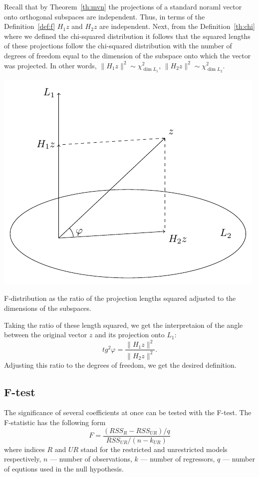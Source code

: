 Recall that by Theorem~\ref{th:mvn} the projections of a standard noraml vector
onto orthogonal subspaces are independent.
Thus, in terms of the Definition~\ref{def:f} $H_1 z$ and $H_2 z$ are independent.
Next, from the Definition~\ref{th:chi} where we defined the chi-squared distribution
it follows that the squared lengths of these projections follow
the chi-squared distribution with the number of degrees of freedom
equal to the dimension of the subspace onto which the vector was projected.
In other words, $\lVert H_1 z \rVert^2 \sim \chi^2_{\dim L_1}$,
$\lVert H_2 z \rVert^2 \sim \chi^2_{\dim L_2}$.

\begin{marginfigure}
\includegraphics[scale=0.7]{figures/04_f_dist_example.pdf}
\caption{F-distribution as the ratio of the projection lengths squared
adjusted to the dimensions of the subspaces.}
\label{fig:f_dist}
\end{marginfigure}

Taking the ratio of these length squared, we get the interpretaion
of the angle between the original vector $z$ and its projection onto $L_1$:
\[
tg^2 \varphi = \frac{\lVert H_1 z \rVert^2}{\lVert H_2 z \rVert^2}.
\]
Adjusting this ratio to the degrees of freedom, we get the desired definition.


\subsection{F-test}

The significance of several coefficients at once can be tested with the F-test.
The F-statistic has the following form
\[
F = \frac{(RSS_{R} - RSS_{UR})/q}{RSS_{UR}/(n-k_{UR})}
\]
where indices $R$ and $UR$ stand for the restricted and unrestricted models
respectively, $n$ — number of observations, $k$ — number of regressors,
$q$ — number of equtions used in the null hypothesis.


